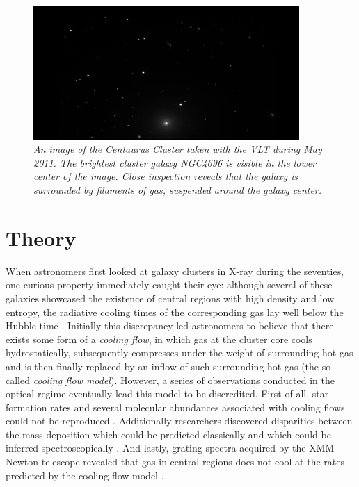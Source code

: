 \documentclass[twoside,single]{lion-msc}
\begin{document}
        \begin{figure}[ht]
      \centering
        \includegraphics[width=0.9\textwidth]{NGC4696.jpeg}
      \caption{\textit{An image of the Centaurus Cluster taken with the VLT during May 2011. The brightest cluster galaxy NGC4696 is visible in the lower center of the image. Close inspection reveals that the galaxy is surrounded by filaments of gas, suspended around the galaxy center.}}
      \label{fig:NGC4696}
    \end{figure}
    
    
    
\chapter{Theory}    
    
     When astronomers first looked at galaxy clusters in X-ray during the seventies, one curious property immediately caught their eye: although several of these galaxies showcased the existence of central regions with high density and low entropy, the radiative cooling times of the corresponding gas lay well below the Hubble time \citep{Fabian1977, Lea1973, Cowie1977, Mathews1978}. Initially this discrepancy led astronomers to believe that there exists some form of a \textit{cooling flow}, in which gas at the cluster core cools hydrostatically, subsequently compresses under the weight of surrounding hot gas and is then finally replaced by an inflow of such surrounding hot gas (the so-called \textit{cooling flow model}). However, a series of observations conducted in the optical regime eventually lead this model to be discredited. First of all, star formation rates and several molecular abundances associated with cooling flows could not be reproduced \citep{McNamara1989, Edge2001}. Additionally researchers discovered disparities between the mass deposition which could be predicted classically and which could be inferred spectroscopically \citep{Makishima2001}. And lastly, grating spectra acquired by the XMM-Newton telescope revealed that gas in central regions does not cool at the rates predicted by the cooling flow model \citep{Peterson2001, Peterson2003, Tamura2001, Xu2002}. \\
    
\end{document}
